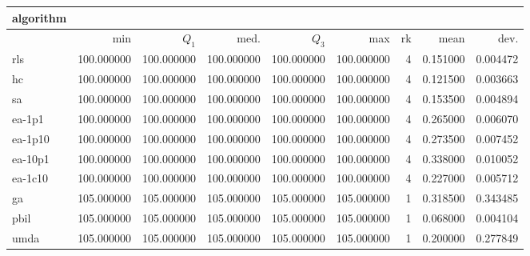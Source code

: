 \begin{tabular}{@{}l*{5}{>{{}}N{3}{0}}>{{}}N{2}{0}N{1}{3}N{1}{3}@{}}
\toprule
{algorithm} &  &  \\
\midrule
& {min} & {$Q_1$} & {med.} & {$Q_3$} & {max} & {rk} & {mean} & {dev.} \\
\midrule
rls & 100.000000 & 100.000000 & 100.000000 & 100.000000 & 100.000000 & 4 & 0.151000 & 0.004472 \\
 hc & 100.000000 & 100.000000 & 100.000000 & 100.000000 & 100.000000 & 4 & 0.121500 & 0.003663 \\
 sa & 100.000000 & 100.000000 & 100.000000 & 100.000000 & 100.000000 & 4 & 0.153500 & 0.004894 \\
 ea-1p1 & 100.000000 & 100.000000 & 100.000000 & 100.000000 & 100.000000 & 4 & 0.265000 & 0.006070 \\
 ea-1p10 & 100.000000 & 100.000000 & 100.000000 & 100.000000 & 100.000000 & 4 & 0.273500 & 0.007452 \\
 ea-10p1 & 100.000000 & 100.000000 & 100.000000 & 100.000000 & 100.000000 & 4 & 0.338000 & 0.010052 \\
 ea-1c10 & 100.000000 & 100.000000 & 100.000000 & 100.000000 & 100.000000 & 4 & 0.227000 & 0.005712 \\
 ga & {\color{blue}} 105.000000 & {\color{blue}} 105.000000 & {\color{blue}} 105.000000 & {\color{blue}} 105.000000 & {\color{blue}} 105.000000 & 1 & 0.318500 & 0.343485 \\
 pbil & {\color{blue}} 105.000000 & {\color{blue}} 105.000000 & {\color{blue}} 105.000000 & {\color{blue}} 105.000000 & {\color{blue}} 105.000000 & 1 & 0.068000 & 0.004104 \\
 umda & {\color{blue}} 105.000000 & {\color{blue}} 105.000000 & {\color{blue}} 105.000000 & {\color{blue}} 105.000000 & {\color{blue}} 105.000000 & 1 & 0.200000 & 0.277849 \\
 \bottomrule
\end{tabular}
